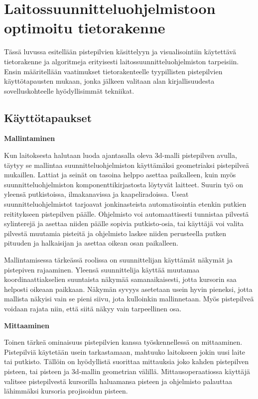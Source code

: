 \section{Laitossuunnitteluohjelmistoon optimoitu tietorakenne}

Tässä luvussa esitellään pistepilvien käsittelyyn ja visualisointiin käytettävä tietorakenne ja algoritmeja erityisesti laitossuunnitteluohjelmiston tarpeisiin. Ensin määritellään vaatimukset tietorakenteelle tyypillisten pistepilvien käyttötapausten mukaan, jonka jälkeen valitaan alan kirjallisuudesta sovelluskohteelle hyödyllisimmät tekniikat.

\subsection{Käyttötapaukset}

\large\textbf{Mallintaminen}
\normalsize

\noindent Kun laitoksesta halutaan luoda ajantasalla oleva 3d-malli pistepilven avulla, täytyy se mallintaa suunnitteluohjelmiston käyttämäksi geometriaksi pistepilveä mukaillen. Lattiat ja seinät on tasoina helppo asettaa paikalleen, kuin myös suunnitteluohjelmiston komponenttikirjastosta löytyvät laitteet. Suurin työ on yleensä putkistoissa, ilmakanavissa ja kaapeliradoissa. Useat suunnitteluohjelmistot tarjoavat jonkinasteista automatisointia etenkin putkien reititykseen pistepilven päälle. Ohjelmisto voi automaattisesti tunnistaa pilvestä sylinterejä ja asettaa niiden päälle sopivia putkisto-osia, tai käyttäjä voi valita pilvestä muutamia pisteitä ja ohjelmisto laskee niiden perusteella putken pituuden ja halkaisijan ja asettaa oikean osan paikalleen.

Mallintamisessa tärkeässä roolissa on suunnittelijan käyttämät näkymät ja pistepiven rajaaminen. Yleensä suunnittelija käyttää muutamaa koordinaattiakselien suuntaista näkymää samanaikaisesti, jotta kursorin saa helposti oikeaan paikkaan. Näkymän syvyys asetetaan usein hyvin pieneksi, jotta mallista näkyisi vain se pieni siivu, jota kulloinkin mallinnetaan. Myös pistepilveä voidaan rajata niin, että siitä näkyy vain tarpeellinen osa. 

\large\textbf{Mittaaminen}
\normalsize

\noindent Toinen tärkeä ominaisuus pistepilvien kanssa työskennellessä on mittaaminen. Pistepilviä käytetään usein tarkastamaan, mahtuuko laitokseen jokin uusi laite tai putkisto. Tällöin on hyödyllistä suorittaa mittauksia joko kahden pistepilven pisteen, tai pisteen ja 3d-mallin geometrian välillä. Mittausoperaatiossa käyttäjä valitsee pistepilvestä kursorilla haluamansa pisteen ja ohjelmisto palauttaa lähimmäksi kursoria projisoidun pisteen. 

